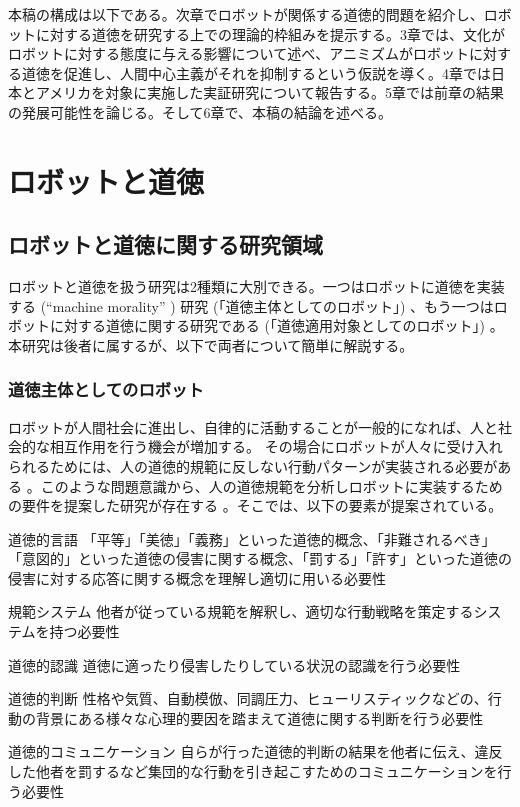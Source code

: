 \documentclass[a4j,12pt]{jreport}
\begin{document}
本稿の構成は以下である。次章でロボットが関係する道徳的問題を紹介し、ロボットに対する道徳を研究する上での理論的枠組みを提示する。3章では、文化がロボットに対する態度に与える影響について述べ、アニミズムがロボットに対する道徳を促進し、人間中心主義がそれを抑制するという仮説を導く。4章では日本とアメリカを対象に実施した実証研究について報告する。5章では前章の結果の発展可能性を論じる。そして6章で、本稿の結論を述べる。






\chapter{ロボットと道徳}

\section{ロボットと道徳に関する研究領域}
ロボットと道徳を扱う研究は2種類に大別できる。一つはロボットに道徳を実装する (``machine morality'' \cite{roboeth}) 研究 (「道徳主体としてのロボット」) 、もう一つはロボットに対する道徳に関する研究である (「道徳適用対象としてのロボット」) 。本研究は後者に属するが、以下で両者について簡単に解説する。
\subsection{道徳主体としてのロボット}
ロボットが人間社会に進出し、自律的に活動することが一般的になれば、人と社会的な相互作用を行う機会が増加する。
その場合にロボットが人々に受け入れられるためには、人の道徳的規範に反しない行動パターンが実装される必要がある\cite{roboeth, moralrobo} 。このような問題意識から、人の道徳規範を分析しロボットに実装するための要件を提案した研究が存在する\cite{moralrobo} 。そこでは、以下の要素が提案されている。
\begin{description}
\item{道徳的言語} 「平等」「美徳」「義務」といった道徳的概念、「非難されるべき」「意図的」といった道徳の侵害に関する概念、「罰する」「許す」といった道徳の侵害に対する応答に関する概念を理解し適切に用いる必要性
\item{規範システム} 他者が従っている規範を解釈し、適切な行動戦略を策定するシステムを持つ必要性
\item{道徳的認識} 道徳に適ったり侵害したりしている状況の認識を行う必要性
\item{道徳的判断} 性格や気質、自動模倣、同調圧力、ヒューリスティックなどの、行動の背景にある様々な心理的要因を踏まえて道徳に関する判断を行う必要性
\item{道徳的コミュニケーション} 自らが行った道徳的判断の結果を他者に伝え、違反した他者を罰するなど集団的な行動を引き起こすためのコミュニケーションを行う必要性
\end{description}
\end{document}
